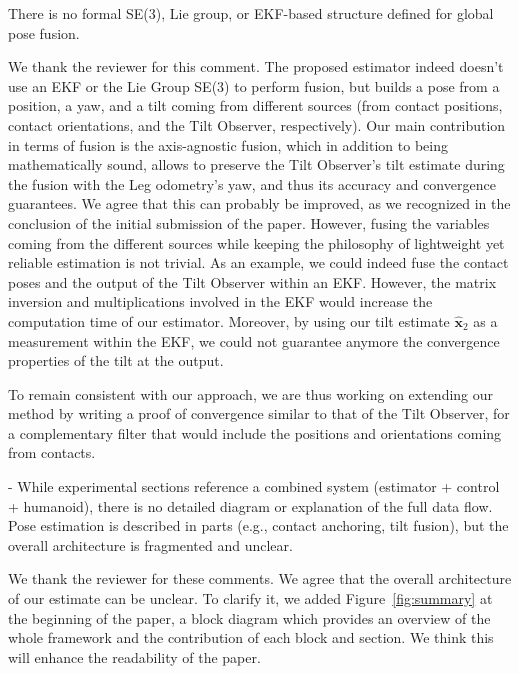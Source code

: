\begin{revquote}\hypertarget{CommentSe3Fusion}{}
There is no formal SE(3), Lie group, or EKF-based structure defined for global pose fusion.
\end{revquote}


We thank the reviewer for this comment. The proposed estimator indeed doesn't use an EKF or the Lie Group SE(3) to perform fusion, but builds a pose from a position, a yaw, and a tilt coming from different sources (from contact positions, contact orientations, and the Tilt Observer, respectively). Our main contribution in terms of fusion is the axis-agnostic fusion, which in addition to being mathematically sound, allows to preserve the Tilt Observer's tilt estimate during the fusion with the Leg odometry's yaw, and thus its accuracy and convergence guarantees. We agree that this can probably be improved, as we recognized in the conclusion of the initial submission of the paper. However, fusing the variables coming from the different sources while keeping the philosophy of lightweight yet reliable estimation is not trivial. 
As an example, we could indeed fuse the contact poses and the output of the Tilt Observer within an EKF. However, the matrix inversion and multiplications involved in the EKF would increase the computation time of our estimator. Moreover, by using our tilt estimate $\hat{\boldsymbol{x}}_{2}$ as a measurement within the EKF, we could not guarantee anymore the convergence properties of the tilt at the output.

To remain consistent with our approach, we are thus working on extending our method by writing a proof of convergence similar to that of the Tilt Observer, for a complementary filter that would include the positions and orientations coming from contacts. 




\begin{revquote}
- While experimental sections reference a combined system (estimator + control + humanoid), there is no detailed diagram or explanation of the full data flow. Pose estimation is described in parts (e.g., contact anchoring, tilt fusion), but the overall architecture is fragmented and unclear.
\end{revquote}


We thank the reviewer for these comments. We agree that the overall architecture of our estimate can be unclear. To clarify it, we added Figure~\ref{fig:summary} at the beginning of the paper, a block diagram which provides an overview of the whole framework and the contribution of each block and section. We think this will enhance the readability of the paper.

